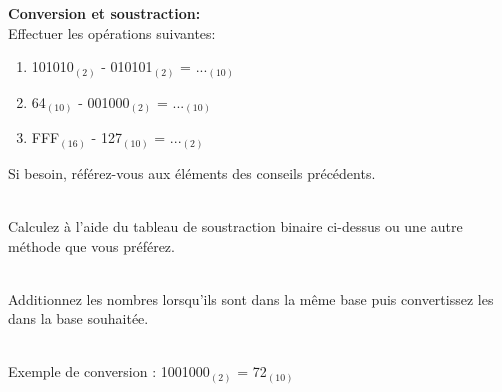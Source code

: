 \begin{Exercice}[20 minutes] \textbf{Conversion et soustraction:}\\
    Effectuer les opérations suivantes:
    \begin{enumerate}
        \item 101010$_{(2)}$ - 010101$_{(2)}$ = ...$_{(10)}$
        \item 64$_{(10)}$ - 001000$_{(2)}$ = ...$_{(10)}$
        \item FFF$_{(16)}$ - 127$_{(10)}$ = ...$_{(2)}$
    \end{enumerate}
    \begin{conseil}
            Si besoin, référez-vous aux éléments des conseils précédents.\\\ 
            
            Calculez à l'aide du tableau de soustraction binaire ci-dessus ou une autre méthode que vous préférez.\\\
            
            Additionnez les nombres lorsqu'ils sont dans la même base puis convertissez les dans la base souhaitée.\\\
            
            Exemple de conversion : 1001000$_{(2)}$ = 72$_{(10)}$\\
            

\end{conseil}
\end{Exercice}
